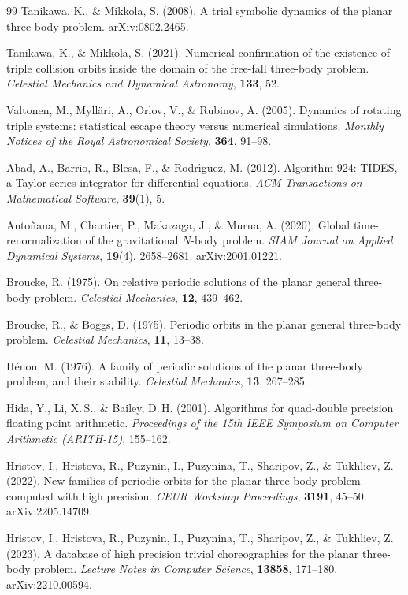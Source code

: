 \documentclass[11pt,a4paper]{article}
\begin{document}
\begin{thebibliography}{99}
Tanikawa, K., \& Mikkola, S. (2008).
A trial symbolic dynamics of the planar three-body problem.
arXiv:0802.2465.

Tanikawa, K., \& Mikkola, S. (2021).
Numerical confirmation of the existence of triple collision orbits inside the domain of the free-fall three-body problem.
\textit{Celestial Mechanics and Dynamical Astronomy}, \textbf{133}, 52.

Valtonen, M., Myll\"{a}ri, A., Orlov, V., \& Rubinov, A. (2005).
Dynamics of rotating triple systems: statistical escape theory versus numerical simulations.
\textit{Monthly Notices of the Royal Astronomical Society}, \textbf{364}, 91--98.


Abad, A., Barrio, R., Blesa, F., \& Rodr{\'\i}guez, M. (2012).
Algorithm 924: TIDES, a Taylor series integrator for differential equations.
\textit{ACM Transactions on Mathematical Software}, \textbf{39}(1), 5.

Anto{\~n}ana, M., Chartier, P., Makazaga, J., \& Murua, A. (2020).
Global time-renormalization of the gravitational $N$-body problem.
\textit{SIAM Journal on Applied Dynamical Systems}, \textbf{19}(4), 2658--2681.
arXiv:2001.01221.

Broucke, R. (1975).
On relative periodic solutions of the planar general three-body problem.
\textit{Celestial Mechanics}, \textbf{12}, 439--462.

Broucke, R., \& Boggs, D. (1975).
Periodic orbits in the planar general three-body problem.
\textit{Celestial Mechanics}, \textbf{11}, 13--38.

H{\'e}non, M. (1976).
A family of periodic solutions of the planar three-body problem, and their stability.
\textit{Celestial Mechanics}, \textbf{13}, 267--285.

Hida, Y., Li, X.\,S., \& Bailey, D.\,H. (2001).
Algorithms for quad-double precision floating point arithmetic.
\textit{Proceedings of the 15th IEEE Symposium on Computer Arithmetic (ARITH-15)}, 155--162.

Hristov, I., Hristova, R., Puzynin, I., Puzynina, T., Sharipov, Z., \& Tukhliev, Z. (2022).
New families of periodic orbits for the planar three-body problem computed with high precision.
\textit{CEUR Workshop Proceedings}, \textbf{3191}, 45--50.
arXiv:2205.14709.

Hristov, I., Hristova, R., Puzynin, I., Puzynina, T., Sharipov, Z., \& Tukhliev, Z. (2023).
A database of high precision trivial choreographies for the planar three-body problem.
\textit{Lecture Notes in Computer Science}, \textbf{13858}, 171--180.
arXiv:2210.00594.


\end{thebibliography}
\end{document}
